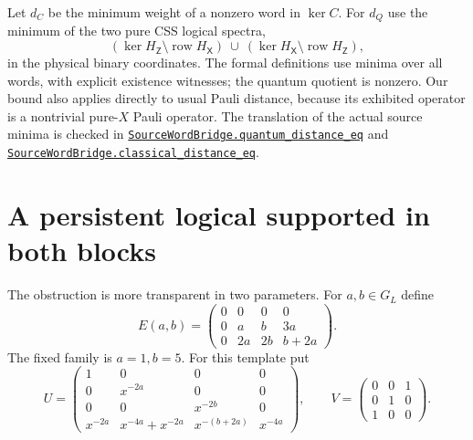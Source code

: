 \documentclass[11pt]{article}
\makeatletter
\theoremstyle{definition}\newtheorem{definition}[theorem]{Definition}
\newcommand{\row}{\operatorname{row}}
\newcommand{\HX}{H_{\mathsf X}}
\newcommand{\HZ}{H_{\mathsf Z}}
\newcommand{\proofcommit}{98eb91cd9049e6a88887a5ba79150ad96a4a3e53}
\newcommand{\proofbase}{https://github.com/alectionary/vibe-math/blob/\proofcommit/formalization/distance-preservation}
\newcommand{\lean}[2]{\href{\proofbase/#1.lean\#L\csname leanline@#2\endcsname}{\nolinkurl{#2}}}
\makeatother
\begin{document}
Let $d_C$ be the minimum weight of a nonzero word in $\ker C$.
For $d_Q$ use the minimum of the two pure CSS logical spectra,
\[
 (\ker\HZ\setminus\row\HX)\ \cup\
 (\ker\HX\setminus\row\HZ),
\]
in the physical binary coordinates. The formal definitions use minima
over all words, with explicit existence witnesses; the quantum quotient
is nonzero. Our bound also applies directly to usual Pauli distance,
because its exhibited operator is a nontrivial pure-$X$ Pauli operator.
The translation of the actual source minima is checked in
\lean{SourceWordBridge}{SourceWordBridge.quantum_distance_eq} and
\lean{SourceWordBridge}{SourceWordBridge.classical_distance_eq}.

\section{A persistent logical supported in both blocks}\label{sec:logical}

The obstruction is more transparent in two parameters. For $a,b\in G_L$
define
\begin{equation}\label{eq:param}
 E(a,b)=\begin{pmatrix}0&0&0&0\\0&a&b&3a\\0&2a&2b&b+2a\end{pmatrix}.
\end{equation}
The fixed family is $a=1,b=5$. For this template put
\begin{equation}\label{eq:UV}
 U=\begin{pmatrix}
 1&0&0&0\\0&x^{-2a}&0&0\\0&0&x^{-2b}&0\\
 x^{-2a}&x^{-4a}+x^{-2a}&x^{-(b+2a)}&x^{-4a}
 \end{pmatrix},\qquad
 V=\begin{pmatrix}0&0&1\\0&1&0\\1&0&0\end{pmatrix}.
\end{equation}
\end{document}

